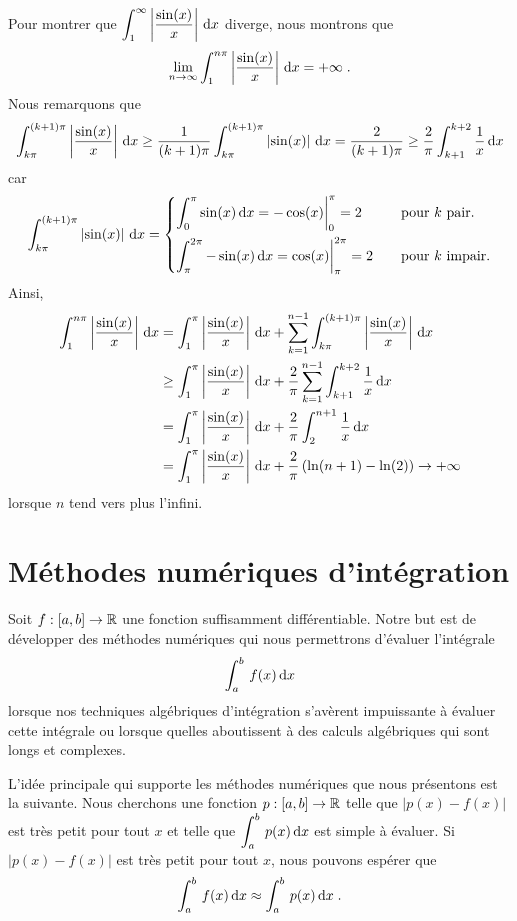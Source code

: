 {\begin{rmk}[\theory]
 Pour montrer que
$\displaystyle \int_1^\infty \left| \frac{\sin(x)}{x} \right| \,\mathrm{d}x$
diverge, nous montrons que
\[
\lim_{n\rightarrow \infty} 
\int_1^{n\pi} \left| \frac{\sin(x)}{x} \right| \,\mathrm{d}x = +\infty \; .
\]
Nous remarquons que
\[
\int_{k\pi}^{(k+1)\pi} \left| \frac{\sin(x)}{x} \right| \,\mathrm{d}x
\geq \frac{1}{(k+1)\pi} \int_{k\pi}^{(k+1)\pi} \left| \sin(x) \right| \,\mathrm{d}x
= \frac{2}{(k+1)\pi} \geq \frac{2}{\pi} \int_{k+1}^{k+2} \frac{1}{x} \,\mathrm{d}x
\]
car
\[
\int_{k\pi}^{(k+1)\pi} \left| \sin(x) \right| \,\mathrm{d}x =
\begin{cases}
\displaystyle \int_0^{\pi} \sin(x) \,\mathrm{d}x = -\cos(x)\bigg|_0^\pi = 2 & \quad
\text{pour $k$ pair.} \\[1em]
\displaystyle \int_\pi^{2\pi} -\sin(x) \,\mathrm{d}x = \cos(x)\bigg|_\pi^{2\pi}
 = 2 & \quad \text{pour $k$ impair.}
\end{cases}
\]
Ainsi,
\begin{align*}
\int_1^{n\pi} \left| \frac{\sin(x)}{x} \right| \,\mathrm{d}x
&= \int_1^\pi \left| \frac{\sin(x)}{x} \right| \,\mathrm{d}x
+ \sum_{k=1}^{n-1} \int_{k\pi}^{(k+1)\pi} \left| \frac{\sin(x)}{x}
\right| \,\mathrm{d}x \\
&\geq \int_1^\pi \left| \frac{\sin(x)}{x} \right| \,\mathrm{d}x
+ \frac{2}{\pi} \sum_{k=1}^{n-1} \int_{k+1}^{k+2} \frac{1}{x}\,\mathrm{d}x \\
&= \int_1^\pi \left| \frac{\sin(x)}{x} \right| \,\mathrm{d}x
+ \frac{2}{\pi} \int_2^{n+1} \frac{1}{x}\,\mathrm{d}x \\
&= \int_1^\pi \left| \frac{\sin(x)}{x} \right| \,\mathrm{d}x
+ \frac{2}{\pi} \left( \ln(n+1)-\ln(2)\right) \rightarrow +\infty
\end{align*}
lorsque $n$ tend vers plus l'infini.
\end{rmk}

\section{Méthodes numériques d'intégration \eng}

Soit $f:[a,b]\rightarrow \mathbb{R}$ une fonction suffisamment
différentiable.  Notre but est de développer des méthodes numériques
qui nous permettrons d'évaluer l'intégrale
\[
\int_a^b\,f(x) \,\mathrm{d}x
\]
lorsque nos techniques algébriques d'intégration s'avèrent impuissante
à évaluer cette intégrale ou lorsque quelles aboutissent à des calculs
algébriques qui sont longs et complexes.

L'idée principale qui supporte les méthodes numériques que nous
présentons est la suivante.  Nous cherchons une fonction
$p:[a,b] \rightarrow \mathbb{R}$ telle que $|p(x)-f(x)|$ est très petit pour
tout $x$ et telle que $\displaystyle \int_a^b\,p(x) \,\mathrm{d}x$ est simple
à évaluer.  Si $|p(x)-f(x)|$ est très petit pour tout $x$, nous pouvons
espérer que
\[
\int_a^b\,f(x) \,\mathrm{d}x \approx \int_a^b\,p(x) \,\mathrm{d}x \; .
\]

}
